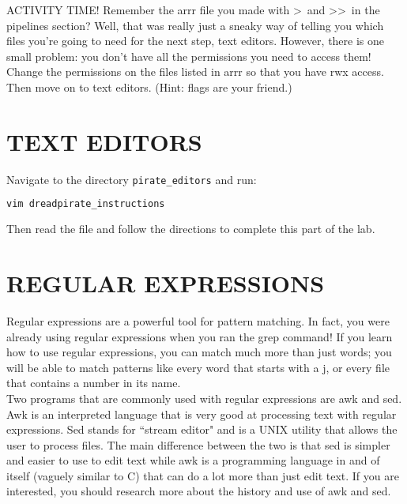 \documentclass[11pt,a4paper]{article}
\begin{document}
ACTIVITY TIME! Remember the arrr file you made with \textgreater\ and \textgreater\textgreater\ in the pipelines section? Well, that was really just a sneaky way of telling you which files you're going to need for the next step, text editors. However, there is one small problem: you don't have all the permissions you need to access them! Change the permissions on the files listed in arrr so that you have rwx access. Then move on to text editors. (Hint: flags are your friend.)



\pagebreak

\section{TEXT EDITORS}

Navigate to the directory \verb|pirate_editors| and run:

\begin{lstlisting}[basicstyle=\ttfamily, backgroundcolor = \color{lightgray}, language = bash, xleftmargin = 0cm, framexleftmargin = 1em, breaklines=true]
vim dreadpirate_instructions
\end{lstlisting}

Then read the file and follow the directions to complete this part of the lab. \\



\pagebreak

\section{REGULAR EXPRESSIONS}

\indent\indent Regular expressions are a powerful tool for pattern matching. In fact, you were already using regular expressions when you ran the grep command! If you learn how to use regular expressions, you can match much more than just words; you will be able to match patterns like every word that starts with a j, or every file that contains a number in its name. \\

Two programs that are commonly used with regular expressions are awk and sed. Awk is an interpreted language that is very good at processing text with regular expressions. Sed stands for ``stream editor" and is a UNIX utility that allows the user to process files. The main difference between the two is that sed is simpler and easier to use to edit text while awk is a programming language in and of itself (vaguely similar to C) that can do a lot more than just edit text. If you are interested, you should research more about the history and use of awk and sed. \\
\end{document}
